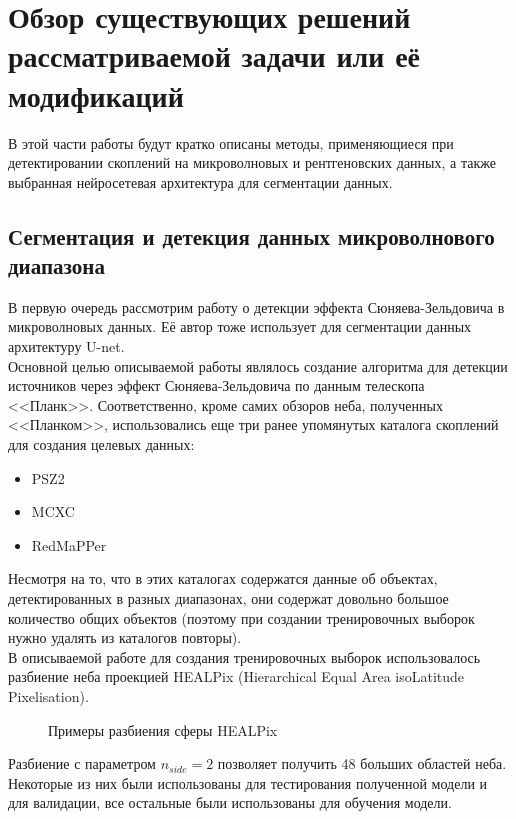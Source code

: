 \chapter{Обзор существующих решений рассматриваемой задачи или её модификаций}
\label{cha:ch_2}

В этой части работы будут кратко описаны методы, применяющиеся при детектировании скоплений на 
микроволновых и рентгеновских данных, а также выбранная нейросетевая архитектура для сегментации 
данных.\\

\section{Сегментация и детекция данных микроволнового диапазона}

В первую очередь рассмотрим работу о детекции эффекта Сюняева-Зельдовича \cite{Bonjean} в 
микроволновых данных. Её автор тоже использует для сегментации данных архитектуру U-net. \\

Основной целью описываемой работы являлось создание алгоритма для детекции источников через эффект 
Сюняева-Зельдовича по данным телескопа <<Планк>>. Соответственно, кроме самих обзоров неба, полученных 
<<Планком>>, использовались еще три ранее упомянутых каталога скоплений для создания целевых данных:

\begin{itemize}
	\item PSZ2 
	\item MCXC 
	\item RedMaPPer 
\end{itemize}

Несмотря на то, что в этих каталогах содержатся данные об объектах, детектированных в разных 
диапазонах, они содержат довольно большое количество общих объектов (поэтому при создании 
тренировочных выборок нужно удалять из каталогов повторы). \\

В описываемой работе для создания тренировочных выборок использовалось разбиение неба проекцией 
HEALPix (Hierarchical Equal Area isoLatitude Pixelisation). \\
\begin{figure}[h]
	\caption{Примеры разбиения сферы HEALPix \cite{Healpix}}
\end{figure}

Разбиение с параметром $n_{side}=2$ позволяет получить 48 больших областей неба. Некоторые из них 
были использованы для тестирования полученной модели и для валидации, все остальные были 
использованы для обучения модели.\\ 

